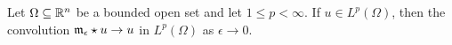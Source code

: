 \documentclass[10pt,a4paper]{article}
\begin{document}
\begin{lemma}
    Let $\Omega \subseteq {\mathbb R}^{n}$ be a bounded open set and let $1 \leq p < \infty$. 
    If $u \in L^{p}(\Omega)$, then the convolution ${\mathfrak m}_{\epsilon} \star u \rightarrow u$ in $L^{p}(\Omega)$ as $\epsilon \rightarrow 0$.
\end{lemma}

\end{document}
